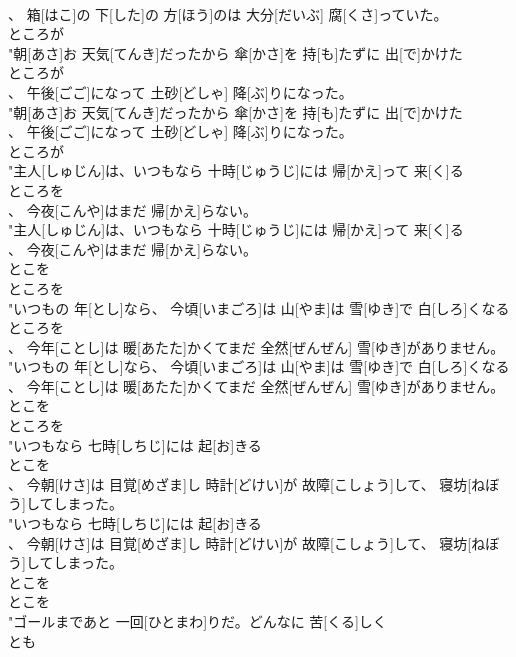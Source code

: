 \documentclass[8pt]{extreport}
\begin{document}
\begin{CJK}{UTF8}{min}
\\	、 箱[はこ]の 下[した]の 方[ほう]のは 大分[だいぶ] 腐[くさ]っていた。
\\	ところが
\\	"朝[あさ]お 天気[てんき]だったから 傘[かさ]を 持[も]たずに 出[で]かけた
\\	ところが
\\	、 午後[ごご]になって 土砂[どしゃ] 降[ぶ]りになった。
\\	"朝[あさ]お 天気[てんき]だったから 傘[かさ]を 持[も]たずに 出[で]かけた
\\	、 午後[ごご]になって 土砂[どしゃ] 降[ぶ]りになった。
\\	ところが
\\	"主人[しゅじん]は、いつもなら 十時[じゅうじ]には 帰[かえ]って 来[く]る
\\	ところを
\\	、 今夜[こんや]はまだ 帰[かえ]らない。
\\	"主人[しゅじん]は、いつもなら 十時[じゅうじ]には 帰[かえ]って 来[く]る
\\	、 今夜[こんや]はまだ 帰[かえ]らない。
\\	とこを 
\\	ところを
\\	"いつもの 年[とし]なら、 今頃[いまごろ]は 山[やま]は 雪[ゆき]で 白[しろ]くなる
\\	ところを
\\	、 今年[ことし]は 暖[あたた]かくてまだ 全然[ぜんぜん] 雪[ゆき]がありません。
\\	"いつもの 年[とし]なら、 今頃[いまごろ]は 山[やま]は 雪[ゆき]で 白[しろ]くなる
\\	、 今年[ことし]は 暖[あたた]かくてまだ 全然[ぜんぜん] 雪[ゆき]がありません。
\\	とこを 
\\	ところを
\\	"いつもなら 七時[しちじ]には 起[お]きる
\\	とこを
\\	、 今朝[けさ]は 目覚[めざま]し 時計[どけい]が 故障[こしょう]して、 寝坊[ねぼう]してしまった。
\\	"いつもなら 七時[しちじ]には 起[お]きる
\\	、 今朝[けさ]は 目覚[めざま]し 時計[どけい]が 故障[こしょう]して、 寝坊[ねぼう]してしまった。
\\	とこを 
\\	とこを
\\	"ゴールまであと 一回[ひとまわ]りだ。どんなに 苦[くる]しく
\\	とも

\end{CJK}
\end{document}
